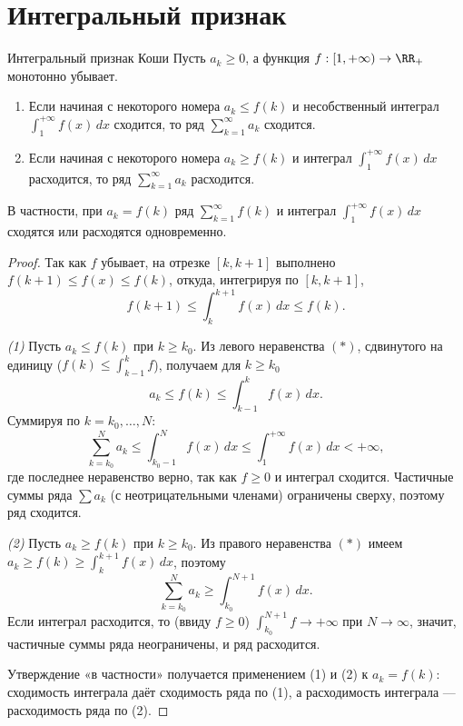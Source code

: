 
\section{Интегральный признак}

\begin{Theorem}{Интегральный признак Коши}{}
	Пусть $a_k\ge0$, а функция $f:[1,+\infty)\to\RR_+$ монотонно убывает.
	\begin{enumerate}
		\item Если начиная с некоторого номера $a_k\le f(k)$ и несобственный
		интеграл $\int_1^{+\infty} f(x)\,dx$ сходится, то ряд
		$\sum_{k=1}^{\infty} a_k$ сходится.
		\item Если начиная с некоторого номера $a_k\ge f(k)$ и интеграл
		$\int_1^{+\infty} f(x)\,dx$ расходится, то ряд $\sum_{k=1}^{\infty} a_k$
		расходится.
	\end{enumerate}
	В частности, при $a_k=f(k)$ ряд $\sum_{k=1}^{\infty} f(k)$ и интеграл
	$\int_1^{+\infty} f(x)\,dx$ сходятся или расходятся одновременно.
\end{Theorem}

\begin{proof}
	Так как $f$ убывает, на отрезке $[k,k+1]$ выполнено
	$f(k+1)\le f(x)\le f(k)$, откуда, интегрируя по $[k,k+1]$,
	\[
	f(k+1)\le \int_{k}^{k+1} f(x)\,dx\le f(k).
	\tag{$\ast$}
	\]

	\emph{(1)} Пусть $a_k\le f(k)$ при $k\ge k_0$. Из левого неравенства
	$(\ast)$, сдвинутого на единицу ($f(k)\le\int_{k-1}^{k} f$), получаем для
	$k\ge k_0$
	\[
	a_k\le f(k)\le \int_{k-1}^{k} f(x)\,dx.
	\]
	Суммируя по $k=k_0,\dots,N$:
	\[
	\sum_{k=k_0}^{N} a_k
	\le \int_{k_0-1}^{N} f(x)\,dx
	\le \int_{1}^{+\infty} f(x)\,dx<+\infty,
	\]
	где последнее неравенство верно, так как $f\ge0$ и интеграл сходится.
	Частичные суммы ряда $\sum a_k$ (с неотрицательными членами) ограничены
	сверху, поэтому ряд сходится.

	\emph{(2)} Пусть $a_k\ge f(k)$ при $k\ge k_0$. Из правого неравенства
	$(\ast)$ имеем $a_k\ge f(k)\ge\int_{k}^{k+1} f(x)\,dx$, поэтому
	\[
	\sum_{k=k_0}^{N} a_k
	\ge \int_{k_0}^{N+1} f(x)\,dx.
	\]
	Если интеграл расходится, то (ввиду $f\ge0$) $\int_{k_0}^{N+1} f\to+\infty$
	при $N\to\infty$, значит, частичные суммы ряда неограничены, и ряд
	расходится.

	Утверждение «в частности» получается применением (1) и (2) к $a_k=f(k)$:
	сходимость интеграла даёт сходимость ряда по (1), а расходимость интеграла
	--- расходимость ряда по (2).
\end{proof}

